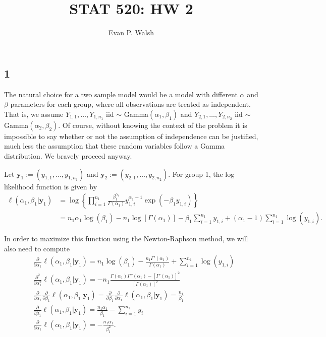 \documentclass[12pt]{article}
\title{STAT 520: HW 2}
\author{Evan P. Walsh}
\begin{document}
\maketitle



\subsection*{1}
The natural choice for a two sample model would be a model with different $\alpha$ and $\beta$ parameters for each group, where all observations are
treated as independent. That is, we assume 
$Y_{1,1}, \dots, Y_{1,n_1}$ iid $\sim$ Gamma$(\alpha_1, \beta_1)$ and $Y_{2,1}, \dots, Y_{2,n_2}$ iid $\sim$ Gamma$(\alpha_2, \beta_2)$.
Of course, without knowing the context of the problem it is impossible to say whether or not the assumption of independence can be justified, much
less the assumption that these random variables follow a Gamma distribution. We bravely proceed anyway.

Let $\bm{y}_1 := (y_{1,1}, \dots, y_{1,n_1})$ and $\bm{y}_2 := (y_{2,1}, \dots, y_{2,n_2})$. For group 1, the log likelihood function is given by
\begin{align*}
  \ell(\alpha_1,\beta_1|\bm{y}_1) & = \log\left\{ \prod_{i=1}^{n_1} \frac{\beta_{1}^{\alpha_1}}{\Gamma(\alpha_1)}y_{1,i}^{\alpha_1 - 1} \exp(-\beta_1
  y_{1,i}) \right\} \\
  & = n_1 \alpha_1 \log(\beta_1) - n_1 \log[\Gamma(\alpha_1)] - \beta_1 \sum_{i=1}^{n_1}y_{1,i} + (\alpha_1 - 1)\sum_{i=1}^{n_1}\log(y_{1,i}).
\end{align*}

In order to maximize this function using the Newton-Raphson method, we will also need to compute
\begin{align*}
  & \frac{\partial}{\partial \alpha_1}\ell(\alpha_1,\beta_1|\bm{y}_1) = n_1 \log(\beta_1) - \frac{n_1 \Gamma'(\alpha_1)}{\Gamma(\alpha_1)} +
  \sum_{i=1}^{n_1}\log(y_{1,i}) \\
  & \frac{\partial^2}{\partial \alpha_{1}^{2}}\ell(\alpha_1,\beta_1|\bm{y}_1) = -n_1\frac{\Gamma(\alpha_1)\Gamma''(\alpha_1) -
  [\Gamma'(\alpha_1)]^{2}}{[\Gamma(\alpha_1)]^{2}} \\
  & \frac{\partial}{\partial \alpha_1}\frac{\partial}{\partial \beta_1}\ell(\alpha_1,\beta_1|\bm{y}_1) = 
  \frac{\partial}{\partial \beta_1}\frac{\partial}{\partial \alpha_1}\ell(\alpha_1,\beta_1|\bm{y}_1) = \frac{n_1}{\beta_1} \\
  & \frac{\partial}{\partial \beta_1}\ell(\alpha_1,\beta_1|\bm{y}_1) = \frac{n_1\alpha_1}{\beta_1} - \sum_{i=1}^{n_1}y_i \\
  & \frac{\partial}{\partial \alpha_1}\ell(\alpha_1,\beta_1|\bm{y}_1) = -\frac{n_1 \alpha_1}{\beta_{1}^{2}}.
\end{align*}
\end{document}
